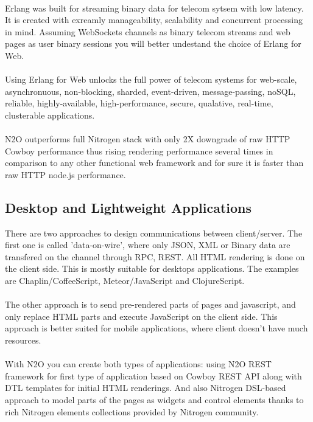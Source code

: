 
\newpage
\paragraph{}
Erlang was built for streaming binary data for telecom sytsem with low latency.
It is created with exreamly manageability, scalability and concurrent processing in mind.
Assuming WebSockets channels as binary telecom streams and web pages as user binary sessions
you will better undestand the choice of Erlang for Web.

\paragraph{}
Using Erlang for Web unlocks the full power of telecom systems for web-scale,
asynchronuous, non-blocking, sharded, event-driven, message-passing, noSQL,
reliable, highly-available, high-performance, secure, qualative, real-time, clusterable applications.

\paragraph{}
N2O outperforms full Nitrogen stack with only 2X downgrade of raw HTTP Cowboy
performance thus rising rendering performance several times in comparison to
any other functional web framework and for sure it is faster than raw HTTP node.js performance.

\subsection*{Desktop and Lightweight Applications}
There are two approaches to design communications between client/server.
The first one is called 'data-on-wire', where only JSON, XML or Binary
data are transfered on the channel through RPC, REST. All HTML rendering
is done on the client side. This is mostly suitable for desktops
applications. The examples are Chaplin/CoffeeScript, Meteor/JavaScript and ClojureScript.
\paragraph{}
The other approach is to send pre-rendered parts of pages and javascript,
and only replace HTML parts and execute JavaScript on the client side. This approach
is better suited for mobile applications, where client doesn't have much resources.
\paragraph{}
With N2O you can create both types of applications: using N2O REST framework
for first type of application based on Cowboy REST API along with DTL
templates for initial HTML renderings. And also Nitrogen DSL-based approach
to model parts of the pages as widgets and control elements thanks to rich
Nitrogen elements collections provided by Nitrogen community. 
